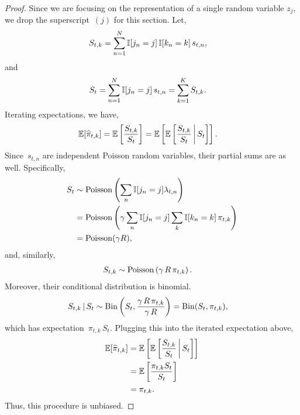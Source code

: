 \begin{proof}
  Since we are focusing on the representation of a single random variable
  $z_j$, we drop the superscript~$(j)$ for this section. Let,
  \begin{align}
    S_{t,k} &= \sum_{n=1}^N \mathbb{I}[j_n=j] \, \mathbb{I}[k_n=k] \, s_{t,n},
  \end{align}
  and
  \begin{align}
    S_{t} &= \sum_{n=1}^N \mathbb{I}[j_n=j] \,  s_{t,n} = \sum_{k=1}^K S_{t,k}.
  \end{align}
  Iterating expectations, we have,
  \begin{align}
    \mathbb{E}[\widehat{\pi}_{t,k}] &=
    \mathbb{E} \left[ \frac{S_{t, k}}{S_{t}} \right]
    = \mathbb{E} \left[
      \mathbb{E} \left[
        \frac{S_{t,k}}{S_t} \, \bigg|\, S_{t}  
      \right] \right].
  \end{align}
  Since~$s_{t, n}$ are independent Poisson random variables, their partial
  sums are as well. Specifically,
  \begin{align}
    S_t &\sim \mathrm{Poisson} \left( \sum_{n} \mathbb{I}[j_n=j] \lambda_{t,n} \right) \\
    &= \mathrm{Poisson} \left(\gamma \sum_n \mathbb{I}[j_n=j] \sum_{k} \mathbb{I}[k_n=k] \, \pi_{t,k} \right) \\
    \label{eq:S_t_rate}
    &= \mathrm{Poisson}(\gamma R),
  \end{align}
  and, similarly,
  \begin{align}
        S_{t,k} &\sim \mathrm{Poisson} \left( \gamma \, R \, \pi_{t, k} \right).
  \end{align}
  Moreover, their conditional distribution is binomial.
  \begin{align}
    S_{t,k} \,|\, S_t &\sim
    \mathrm{Bin} \left( S_t, \frac{\gamma \, R \, \pi_{t,k}}{\gamma \, R} \right)
    =\mathrm{Bin}(S_t, \pi_{t,k}),
  \end{align}
  which has expectation~$\pi_{t,k} \, S_t$.
  Plugging this into the iterated expectation above, 
  \begin{align}
    \mathbb{E}[\widehat{\pi}_{t,k}]
    &= \mathbb{E} \left[
      \mathbb{E} \left[
        \frac{S_{t,k}}{S_t} \, \bigg|\, S_t  \right] \right] \\
    &= \mathbb{E} \left[ 
      \frac{\pi_{t,k} S_t}{S_t} \right]\\
    &= \pi_{t,k}.
  \end{align}
  Thus, this procedure is unbiased.
\end{proof}

